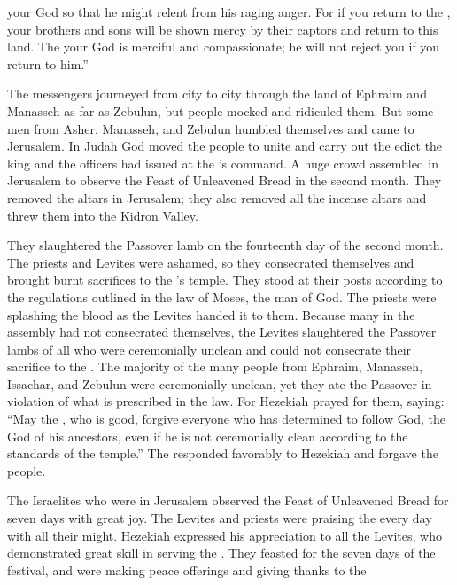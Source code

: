 {{}
your God
so
that he might relent
from
his raging
anger.
For
if you return
to the
{}, your brothers
and sons
will be shown mercy
by their captors
and return
to this
land.
The
{}
your God
is merciful
and compassionate;
he will not
reject
you if
you return
to him.”
\par }{\PP {}The messengers journeyed
from city
to city
through
the land
of Ephraim
and Manasseh
as far
as Zebulun,
but people mocked and ridiculed them.
But
some men
from Asher,
Manasseh,
and Zebulun
humbled
themselves and came
to Jerusalem.
In Judah
God
moved the people
to unite
and carry
out the edict
the king
and the officers
had issued at the
{}’s
command.
A huge
crowd
assembled
in Jerusalem
to observe
the Feast
of Unleavened Bread
in the second
month.
They removed
the altars
in Jerusalem;
they also
removed
all
the incense
altars
and threw
them into the Kidron
Valley.
\par }{\PP {}They slaughtered
the Passover lamb
on the fourteenth
day of the second
month.
The priests
and Levites
were ashamed,
so they consecrated
themselves and brought
burnt sacrifices
to the
{}’s
temple.
They stood
at their posts according to the regulations
outlined
in the law
of Moses,
the man
of God.
The priests
were splashing
the
blood
as the Levites
handed it to them.
Because
many
in the assembly
had not
consecrated
themselves, the Levites
slaughtered
the Passover lambs
of all
who were ceremonially unclean
and could not consecrate
their sacrifice to the
{}.
The majority
of the many
people
from Ephraim,
Manasseh,
Issachar,
and Zebulun
were ceremonially
unclean, yet
they ate
the Passover
in violation of what is prescribed
in the law. For
Hezekiah
prayed
for
them, saying: “May the
{}, who is good,
forgive
everyone
who has determined
to follow
God,
the {}
God
of his ancestors,
even if he is not
ceremonially clean according to the standards
of the temple.”
The
{}
responded favorably
to
Hezekiah
and forgave
the people.
\par }{\PP {}The Israelites
who were
in Jerusalem
observed the Feast
of Unleavened
Bread for seven
days
with great
joy.
The Levites
and priests
were praising
the {}
every
day
with all
their might.
Hezekiah
expressed
his appreciation
to
all
the Levites,
who demonstrated
great
skill in serving
the {}. They feasted
for the seven
days
of the festival,
and were making peace offerings
and giving thanks
to the
}
